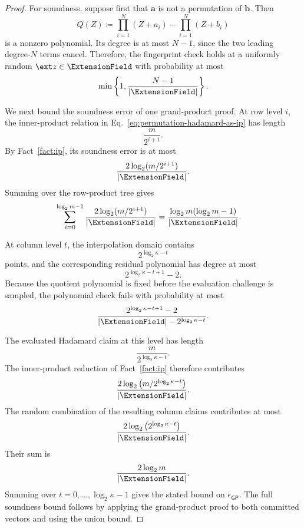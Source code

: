 \begin{proof}
For soundness, suppose first that
\(\bm a\) is not a permutation of \(\bm b\). Then
\[
    Q(Z)
    \coloneqq
    \prod_{i=1}^{N}(Z+a_i)
    -
    \prod_{i=1}^{N}(Z+b_i)
\]
is a nonzero polynomial. Its degree is at most \(N-1\), since
the two leading degree-\(N\) terms cancel. Therefore, the
fingerprint check holds at a uniformly random
\(\ext z\in\ExtensionField\) with probability at most
\[
    \min\left\{
        1,
        \frac{N-1}{|\ExtensionField|}
    \right\}.
\]

We next bound the soundness error of one grand-product proof.
At row level \(i\), the inner-product relation in
Eq.~\eqref{eq:permutation-hadamard-as-ip} has length
\[
    \frac{m}{2^{i+1}}.
\]
By Fact~\ref{fact:ip}, its soundness error is at most
\[
    \frac{
        2\log_2(m/2^{i+1})
    }{
        |\ExtensionField|
    }.
\]
Summing over the row-product tree gives
\[
\begin{aligned}
    \sum_{i=0}^{\log_2m-1}
    \frac{
        2\log_2(m/2^{i+1})
    }{
        |\ExtensionField|
    }
    &=
    \frac{
        \log_2m(\log_2m-1)
    }{
        |\ExtensionField|
    }.
\end{aligned}
\]

At column level \(t\), the interpolation domain contains
\[
    2^{\log_2\kappa-t}
\]
points, and the corresponding residual polynomial has degree at
most
\[
    2^{\log_2\kappa-t+1}-2.
\]
Because the quotient polynomial is fixed before the evaluation
challenge is sampled, the polynomial check fails with
probability at most
\[
    \frac{
        2^{\log_2\kappa-t+1}-2
    }{
        |\ExtensionField|
        -
        2^{\log_2\kappa-t}
    }.
\]

The evaluated Hadamard claim at this level has length
\[
    \frac{m}{2^{\log_2\kappa-t}}.
\]
The inner-product reduction of Fact~\ref{fact:ip} therefore
contributes
\[
    \frac{
        2\log_2
        \left(
            m/2^{\log_2\kappa-t}
        \right)
    }{
        |\ExtensionField|
    }.
\]
The random combination of the resulting column claims
contributes at most
\[
    \frac{
        2\log_2
        \left(
            2^{\log_2\kappa-t}
        \right)
    }{
        |\ExtensionField|
    }.
\]
Their sum is
\[
    \frac{2\log_2m}{|\ExtensionField|}.
\]
Summing over
\(t=0,\ldots,\log_2\kappa-1\) gives the stated bound on
\(\epsilon_{\mathsf{GP}}\). The full soundness bound follows by
applying the grand-product proof to both committed vectors and
using the union bound.


\end{proof}
